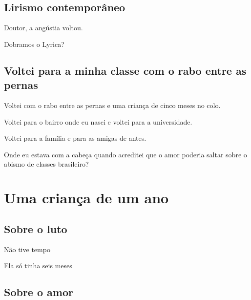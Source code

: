 \chapter{Lirismo contemporâneo}

{\parindent0pt\parskip1pt\raggedright
Doutor, a angústia voltou.

Dobramos o Lyrica?}

\chapter{Voltei para a minha classe com o rabo entre as pernas}

Voltei com o rabo entre as pernas e uma criança de cinco meses no colo.

Voltei para o bairro onde eu nasci e voltei para a universidade.

Voltei para a família e para as amigas de antes.

Onde eu estava com a cabeça quando acreditei que o amor poderia saltar
sobre o abismo de classes brasileiro?

\paginabranca
  \part{Uma criança de um ano}

\chapter{Sobre o luto}

Não tive tempo

Ela só tinha seis meses

\chapter{Sobre o amor}

